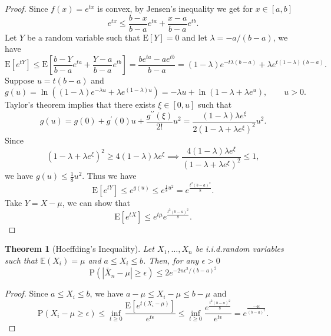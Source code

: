\documentclass{report}
\newtheorem{theorem}{Theorem}[chapter]
\theoremstyle{nonumberplain}
\newtheorem{proof}{Proof.}
\newcommand{\0}{\mathbf{0}}
\begin{document}
\begin{proof} 
Since $f(x)=e^{tx}$ is convex, by Jensen's inequality we get for $x\in[a,b]$
\[
e^{t x} \leq \frac{b-x}{b-a} e^{t a}+\frac{x-a}{b-a} e^{t b}.
\]
Let $Y$ be a random variable such that $\mathrm{E}[Y]=0$ and let $\lambda=-a/(b-a)$, we have
\[
\mathrm{E}[e^{t Y}] \leq \mathrm{E}\left[\frac{b-Y}{b-a} e^{ta}+\frac{Y-a}{b-a} e^{t b}\right]=\frac{be^{t a}-ae^{t b}}{b-a} =(1-\lambda) e^{-t\lambda(b-a)}+\lambda e^{t(1-\lambda)(b-a)}.
\]
Suppose $u=t(b-a)$ and
\[
g(u)=\ln\left((1-\lambda) e^{-\lambda u}+\lambda e^{(1-\lambda)u}\right)=-\lambda u+\ln\left(1-\lambda+\lambda e^u \right),\qquad u>0.
\]
Taylor's theorem implies that there exists $\xi\in [0,u]$ such that
\[
g(u)=g(0)+g^{\prime}(0) u+\frac{g^{\prime \prime}(\xi)}{2 !} u^{2}=\frac{(1-\lambda)\lambda e^\xi}{2(1-\lambda+\lambda e^\xi )^2}u^2.
\]
Since 
\[
(1-\lambda+\lambda e^\xi )^2\ge 4(1-\lambda)\lambda e^\xi\implies  \frac{4(1-\lambda)\lambda e^\xi}{(1-\lambda+\lambda e^\xi )^2}\le1,
\]
we have $g(u)\le\frac{1}{8}u^2$. Thus we have 
\[
\mathrm{E}[e^{t Y}]\le e^{g(u)}\le e^{\frac{1}{8}u^2}=e^{\frac{t^2(b-a)^2}{8}}.
\]
Take $Y=X-\mu$, we can show that
\[
\mathrm{E}\left[e^{t X}\right]\leq e^{t \mu} e^{\frac{t^{2}(b-a)^{2}}{8}}.
\]
\end{proof}
\begin{theorem}[Hoeffding's Inequality]
	Let $X_{1}, \dots, X_{n}$ be i.i.d.random variables such that $\mathbb{E}\left(X_{i}\right)=\mu$ and $a \leq X_{i} \leq b$. Then, for any $\epsilon>0$
	\[
	\mathrm{P}\left(\left|\bar{X}_{n}-\mu\right| \geq \epsilon\right) \leq 2 e^{-2 n \epsilon^{2} /(b-a)^{2}}
	\]
\end{theorem}

\begin{proof}
	Since $a \leq X_{i} \leq b$, we have $a -\mu\leq X_i-\mu \leq b-\mu$ and
	\[
	\mathrm{P}(X_i-\mu\geq \epsilon) \leq \inf _{t \geq 0} \frac{\mathrm{E}\left[e^{t\left(X_i-\mu\right)}\right]}{e^{t\epsilon}}\le\inf _{t \geq 0} \frac{e^{\frac{t^{2}(b-a)^{2}}{8}}}{e^{t\epsilon}}=e^{\tfrac{-4\epsilon}{(b-a)^2}}.
	\]
\end{proof}
\end{document}
